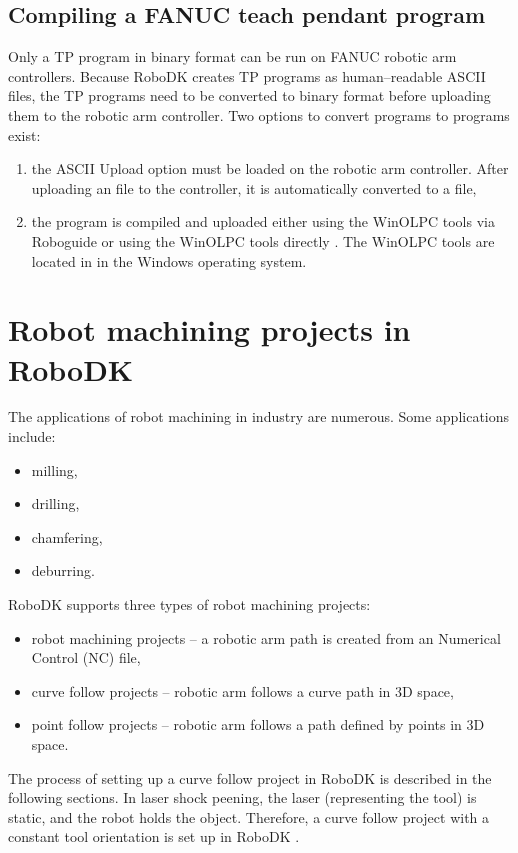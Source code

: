 \subsection{Compiling a FANUC teach pendant program}

Only a TP program in binary format can be run on FANUC robotic arm controllers. Because RoboDK creates TP programs as human--readable ASCII files, the TP programs need to be converted to binary format before uploading them to the robotic arm controller. Two options to convert  programs to  programs exist:

\begin{enumerate}
\item the ASCII Upload option must be loaded on the robotic arm controller. After uploading an  file to the controller, it is automatically converted to a  file,
\item the program is compiled and uploaded either using the WinOLPC  tools via Roboguide or using the WinOLPC tools directly \cite{fanuchandling}. The WinOLPC tools are located in  in the Windows operating system.

\end{enumerate}

\section{Robot machining projects in RoboDK}

The applications of robot machining in industry are numerous. Some applications include:

\begin{itemize}

    \item milling,
    \item drilling,
    \item chamfering,
    \item deburring.

\end{itemize}
RoboDK supports three types of robot machining projects:

\begin{itemize}

    \item robot machining projects -- a robotic arm path is created from an Numerical Control (NC) file,
    \item curve follow projects -- robotic arm follows a curve path in 3D space, 
    \item point follow projects -- robotic arm follows a path defined by points in 3D space.

\end{itemize}
The process of setting up a curve follow project in RoboDK is described in the following sections. In laser shock peening, the laser (representing the tool) is static, and the robot holds the object. Therefore, a curve follow project with a constant tool orientation is set up in RoboDK \cite{machiningproject}.

